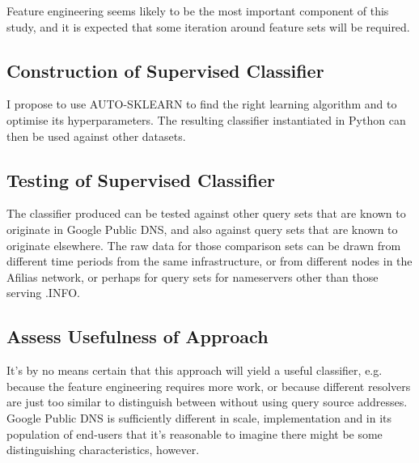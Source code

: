 \documentclass[9pt,technote,letterpaper]{IEEEtran}
\begin{document}
Feature engineering\cite{JasonBrownlee} seems likely to be the most important component of this study, and it is expected that some iteration around feature sets will be required.

\subsection{Construction of Supervised Classifier}
I propose to use AUTO-SKLEARN\cite{NIPS2015_5872} to find the right learning algorithm and to optimise its hyperparameters. The resulting classifier instantiated in Python can then be used against other datasets.

\subsection{Testing of Supervised Classifier}
The classifier produced can be tested against other query sets that are known to originate in Google Public DNS, and also against query sets that are known to originate elsewhere. The raw data for those comparison sets can be drawn from different time periods from the same infrastructure, or from different nodes in the Afilias network, or perhaps for query sets for nameservers other than those serving .INFO.

\subsection{Assess Usefulness of Approach}
It's by no means certain that this approach will yield a useful classifier, e.g. because the feature engineering requires more work, or because different resolvers are just too similar to distinguish between without using query source addresses. Google Public DNS is sufficiently different in scale, implementation and in its population of end-users that it's reasonable to imagine there might be some distinguishing characteristics, however.



\end{document}
